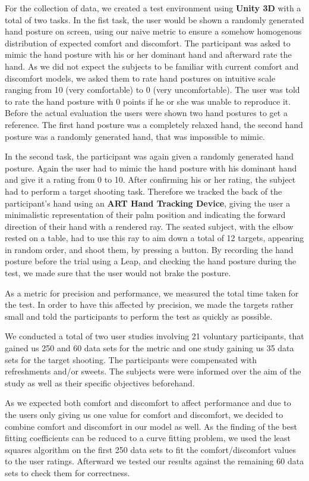 \documentclass{sig-alternate-05-2015}
\begin{document}
For the collection of data, we created a test environment using \textbf{Unity 3D} with a total of two tasks. In the fist task, the user would be shown a randomly generated hand posture on screen, using our naive metric to ensure a somehow homogenous distribution of expected comfort and discomfort. The participant was asked to mimic the hand posture with his or her dominant hand and afterward rate the hand. As we did not expect the subjects to be familiar with current comfort and discomfort models, we asked them to rate hand postures on intuitive scale ranging from 10 (very comfortable) to 0 (very uncomfortable). The user was told to rate the hand posture with 0 points if he or she was unable to reproduce it. Before the actual evaluation the users were shown two hand postures to get a reference. The first hand posture was a completely relaxed hand, the second hand posture was a randomly generated hand, that was impossible to mimic.

In the second task, the participant was again given a randomly generated hand posture. Again the user had to mimic the hand posture with his dominant hand and give it a rating from 0 to 10. After confirming his or her rating, the subject had to perform a target shooting task. Therefore we tracked the back of the participant's hand using an \textbf{ART Hand Tracking Device}, giving the user a minimalistic representation of their palm position and indicating the forward direction of their hand with a rendered ray. The seated subject, with the elbow rested on a table, had to use this ray to aim down a total of 12 targets, appearing in random order, and shoot them, by pressing a button. By recording the hand posture before the trial using a Leap, and checking the hand posture during the test, we made sure that the user would not brake the posture. 

As a metric for precision and performance, we measured the total time taken for the test. In order to have this affected by precision, we made the targets rather small and told the participants to perform the test as quickly as possible.

We conducted a total of two user studies involving 21 voluntary participants, that gained us 250 and 60 data sets for the metric and one study gaining us 35 data sets for the target shooting. The participants were compensated with refreshments and/or sweets.
The subjects were were informed over the aim of the study as well as their specific objectives beforehand.

As we expected both comfort and discomfort to affect performance and due to the users only giving us one value for comfort and discomfort, we decided to combine comfort and discomfort in our model as well. As the finding of the best fitting coefficients can be reduced to a curve fitting problem, we used the least squares algorithm on the first 250 data sets to fit the comfort/discomfort values to the user ratings. Afterward we tested our results against the remaining 60 data sets to check them for correctness. 
\end{document}
